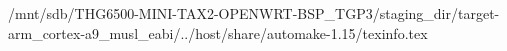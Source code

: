 /mnt/sdb/THG6500-MINI-TAX2-OPENWRT-BSP_TGP3/staging_dir/target-arm_cortex-a9_musl_eabi/../host/share/automake-1.15/texinfo.tex